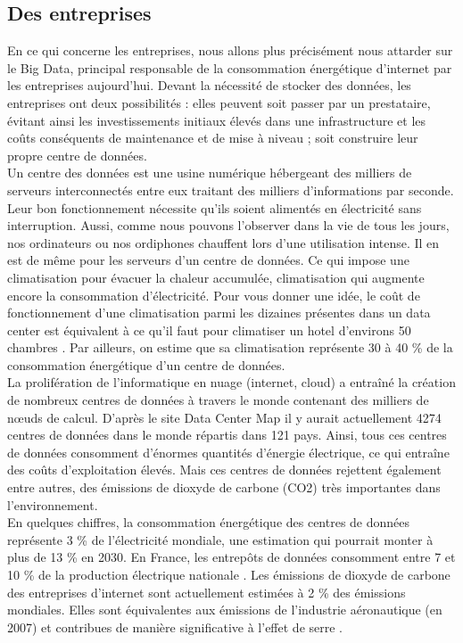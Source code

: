 \documentclass[a4paper,twocolumn,12pt]{article}
\begin{document}
\subsection{Des entreprises}
	
	En ce qui concerne les entreprises, nous allons plus précisément nous attarder sur le Big Data, principal responsable de la consommation énergétique d’internet par les entreprises aujourd’hui. Devant la nécessité de stocker des données, les entreprises ont deux possibilités : elles peuvent soit passer par un prestataire, évitant ainsi les investissements initiaux élevés dans une infrastructure et les coûts conséquents de maintenance et de mise à niveau ; soit construire leur propre centre de données. \\

	Un centre des données est une usine numérique hébergeant des milliers de serveurs interconnectés entre eux traitant des milliers d'informations par seconde. Leur bon fonctionnement nécessite qu’ils soient alimentés en électricité sans interruption. Aussi, comme nous pouvons l’observer dans la vie de tous les jours, nos ordinateurs ou nos ordiphones chauffent lors d'une utilisation intense. Il en est de même pour les serveurs d’un centre de données. Ce qui impose une climatisation pour évacuer la chaleur accumulée, climatisation qui augmente encore la consommation d'électricité. Pour vous donner une idée, le coût de fonctionnement d’une climatisation parmi les dizaines présentes dans un data center est équivalent à ce qu’il faut pour climatiser un hotel d’environs 50 chambres \cite{5}. Par ailleurs, on estime que sa climatisation représente 30 à 40 \% de la consommation énergétique d’un centre de données. \\

	La prolifération de l'informatique en nuage (internet, cloud) a entraîné la création de nombreux centres de données à travers le monde contenant des milliers de nœuds de calcul. D’après le site Data Center Map \cite{6} il y aurait actuellement 4274 centres de données dans le monde répartis dans 121 pays. Ainsi, tous ces centres de données consomment d'énormes quantités d'énergie électrique, ce qui entraîne des coûts d'exploitation élevés. Mais ces centres de données rejettent également entre autres, des émissions de dioxyde de carbone (CO2) très importantes dans l'environnement. \\

	En quelques chiffres, la consommation énergétique des centres de données représente 3 \% de l’électricité mondiale, une estimation qui pourrait monter à plus de 13 \% en 2030. En France, les entrepôts de données consomment entre 7 et 10 \% de la production électrique nationale \cite{7}. Les émissions de dioxyde de carbone des entreprises d'internet sont actuellement estimées à 2 \% des émissions mondiales. Elles sont équivalentes aux émissions de l'industrie aéronautique (en 2007) \cite{8} et contribues de manière significative à l'effet de serre \cite{9}.
\end{document}
